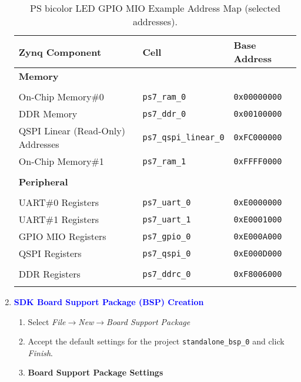 \begin{enumerate}
\begin{enumerate}
\end{enumerate}
%
%
\begin{table}[t]
\caption{PS bicolor LED GPIO MIO Example Address Map (selected addresses).}
\label{tab:blinky_gpio_mio}
\begin{center}
\begin{tabular}{|l|l|l|}
\hline
Zynq Component & Cell & Base Address\\
\hline\hline
\textbf{Memory} &&\\
\hline
&&\\
On-Chip Memory\#0                 & \texttt{ps7\_ram\_0}          & \texttt{0x00000000}\\
DDR Memory                        & \texttt{ps7\_ddr\_0}          & \texttt{0x00100000}\\
QSPI Linear (Read-Only) Addresses & \texttt{ps7\_qspi\_linear\_0} & \texttt{0xFC000000}\\
On-Chip Memory\#1                 & \texttt{ps7\_ram\_1}          & \texttt{0xFFFF0000}\\
&&\\
\hline
\textbf{Peripheral} &&\\
\hline
&&\\
UART\#0 Registers    & \texttt{ps7\_uart\_0}         & \texttt{0xE0000000}\\
UART\#1 Registers    & \texttt{ps7\_uart\_1}         & \texttt{0xE0001000}\\
GPIO MIO  Registers  & \texttt{ps7\_gpio\_0}         & \texttt{0xE000A000}\\
QSPI Registers       & \texttt{ps7\_qspi\_0}         & \texttt{0xE000D000}\\
&&\\
DDR Registers        & \texttt{ps7\_ddrc\_0}         & \texttt{0xF8006000}\\
&&\\
\hline
\end{tabular}
\end{center}
\end{table}

\newpage
\item \textcolor{blue}{\textbf{SDK Board Support Package (BSP) Creation}}
%
\begin{enumerate}
\item Select \emph{File}$\rightarrow$\emph{New}$\rightarrow$\emph{Board Support Package}
\item Accept the default settings for the project \texttt{standalone\_bsp\_0} and
click \emph{Finish}.
\item \textbf{Board Support Package Settings}


\end{enumerate}
\end{enumerate}
